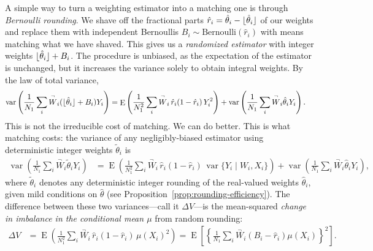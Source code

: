 \documentclass{article}
\theoremstyle{definition}
\DeclareMathOperator{\E}{E}
\DeclareMathOperator{\Var}{var}
\DeclarePairedDelimiter\floor{\lfloor}{\rfloor}
\newcommand{\<}{\langle}
\renewcommand{\>}{\rangle}
\begin{document}
A simple way to turn a weighting estimator into a matching one is through \emph{Bernoulli rounding}. We shave off the fractional parts $\hat r_i = \hat\theta_i - \floor{\hat\theta_i}$ of our weights and replace them with independent Bernoullis $B_i \sim \text{Bernoulli}(\hat r_i)$ with means matching what we have shaved. This gives us a \emph{randomized estimator} with integer weights $\floor{\hat\theta_i} + B_i$. The procedure is unbiased, as the expectation of the estimator is unchanged, but it increases the variance solely to obtain integral weights. By the law of total variance,
\begin{equation}
\label{eq:bernoulli-rounding-variance}
\begin{aligned}
\Var\left(\frac{1}{N_1} \sum_i \overset{\neg}{W}_i (\floor{\hat\theta_i} + B_i) Y_i\right)
&= \E\left(\frac{1}{N_1^2} \sum_i \overset{\neg}{W}_i \, \hat r_i(1 - \hat r_i) \, Y_i^2 \right) + \Var\left(\frac{1}{N_1} \sum_i \overset{\neg}{W}_i \hat\theta_i Y_i\right).
\end{aligned}
\end{equation}
This is not the irreducible cost of matching. We can do better. This is what matching costs: the variance of any negligibly-biased estimator using deterministic integer weights $\tilde\theta_i$ is
\begin{equation}
\label{eq:rounding-variance-deterministic}
\begin{aligned}
\Var\left(\frac{1}{N_1} \sum_i \overset{\neg}{W}_i \tilde\theta_i Y_i\right) &= \E\left(\frac{1}{N_1^2} \sum_i \overset{\neg}{W}_i \, \hat r_i(1 - \hat r_i) \, \Var\{Y_i \mid W_i, X_i\} \right) + \Var\left(\frac{1}{N_1} \sum_i \overset{\neg}{W}_i \hat\theta_i Y_i\right),
\end{aligned}
\end{equation}
where $\tilde\theta_i$ denotes any deterministic integer rounding of the real-valued weights $\hat\theta_i$, given mild conditions on $\hat\theta$ (see Proposition~\ref{prop:rounding-efficiency}). The difference between these two variances---call it $\Delta V$---is the mean-squared \emph{change in imbalance in the conditional mean $\mu$} from random rounding:
\begin{equation}
\label{eq:rounding-excess}
\begin{aligned}
\Delta V
&= \E\left(\frac{1}{N_1^2} \sum_i \overset{\neg}{W}_i \, \hat r_i(1 - \hat r_i) \, \mu(X_i)^2\right)
= \E\left[\left\{\frac{1}{N_1} \sum_i \overset{\neg}{W}_i (B_i - \hat r_i) \mu(X_i)\right\}^2\right].
\end{aligned}
\end{equation}
\end{document}
